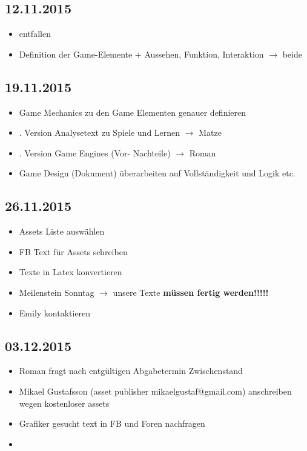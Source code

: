 \subsection{12.11.2015}
\begin{itemize}
\item entfallen
\item Definition der Game-Elemente + Aussehen, Funktion, Interaktion $\rightarrow$ beide

\end{itemize}

\subsection{19.11.2015}
\begin{itemize}
\item Game Mechanics zu den Game Elementen genauer definieren
\item \circledmark{}. Version Analysetext zu Spiele und Lernen $\rightarrow$ Matze
\item \circledmark{}. Version Game Engines (Vor- Nachteile) $\rightarrow$ Roman
\item Game Design (Dokument) überarbeiten auf Vollständigkeit und Logik etc.
\end{itemize}

\subsection{26.11.2015}
\begin{itemize}
\item Assets Liste auswählen
\item FB Text für Assets schreiben
\item \circledmark\quad Texte in Latex konvertieren 
\item \circledmark\quad  Meilenstein Sonntag $\rightarrow$  unsere Texte \bfseries{müssen} fertig werden!!!!!  
\item \circledmark\quad  Emily kontaktieren
\end{itemize}


\subsection{03.12.2015}
\begin{itemize}
\item Roman fragt nach entgültigen Abgabetermin Zwischenstand
\item Mikael Gustafsson (asset publisher mikaelgustaf@gmail.com) anschreiben wegen kostenloser assets
\item Grafiker gesucht text in FB und Foren nachfragen
\item 
\end{itemize}


